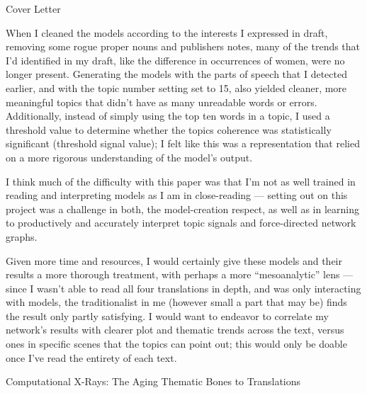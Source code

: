 \documentclass[12pt]{article}
\newenvironment{coverletter}{\begin{center} Cover Letter \end{center}}{\newpage }
\begin{document}
\begin{flushleft}
\begin{spacing}{2.0}
\begin{coverletter}
When I cleaned the models according to the interests I expressed in draft, removing some rogue proper nouns and publishers notes, many of the trends that I'd identified in my draft, like the difference in occurrences of women, were no longer present. Generating the models with the parts of speech that I detected earlier, and with the topic number setting set to 15, also yielded cleaner, more meaningful topics that didn't have as many unreadable words or errors. Additionally, instead of simply using the top ten words in a topic, I used a threshold value to determine whether the topics coherence was statistically significant (threshold signal value); I felt like this was a representation that relied on a more rigorous understanding of the model's output.\linebreak

I think much of the difficulty with this paper was that I'm not as well trained in reading and interpreting models as I am in close-reading --- setting out on this project was a challenge in both, the model-creation respect, as well as in learning to productively and accurately interpret topic signals and force-directed network graphs. \linebreak

Given more time and resources, I would certainly give these models and their results a more thorough treatment, with perhaps a more ``mesoanalytic'' lens --- since I wasn't able to read all four translations in depth, and was only interacting with models, the traditionalist in me (however small a part that may be) finds the result only partly satisfying. I would want to endeavor to correlate my network's results with clearer plot and thematic trends across the text, versus ones in specific scenes that the topics can point out; this would only be doable once I've read the entirety of each text.

\end{coverletter}


\begin{center}
Computational X-Rays: The Aging Thematic Bones to  Translations
\end{center}

\setlength{\parindent}{0.5in}


\end{spacing}
\end{flushleft}
\end{document}
